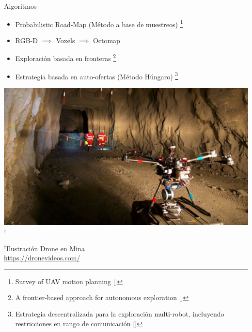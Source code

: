 \documentclass[
  24pt, %
  aspectratio=169, %
]{beamer}
\begin{document}
\begin{frame}{Algoritmos}
  
  \begin{minipage}{0.47\textwidth}
    
    \begin{itemize}
    \item \small Probabilistic Road-Map (Método a base de muestreos) \footnote{Survey of UAV motion planning [\cite{Quan2020}]}  
    \item \small RGB-D $\implies$ Voxels $\implies$ Octomap
      
    \item \small Exploración basada en fronteras \footnote{A frontier-based approach for autonomous exploration [\cite{613851}]}
    \item \small Estrategia basada en auto-ofertas (Método Húngaro) \footnote{Estrategia descentralizada para la exploración multi-robot, incluyendo restricciones en rango de comunicación [\cite{LEAL2013}]}
      
    \end{itemize}
  \end{minipage}
  \hspace{0.1cm}
  \begin{minipage}{0.5\textwidth}
    \includegraphics[width=\textwidth]{maxresdefault.jpg}$^\dag$\\
    \rule{0in}{1.2em}$^\dag$\scriptsize Ilustración Drone en Mina \\
    \tiny \url{https://dronevideos.com/} 
  \end{minipage}
  
\end{frame}
\end{document}
